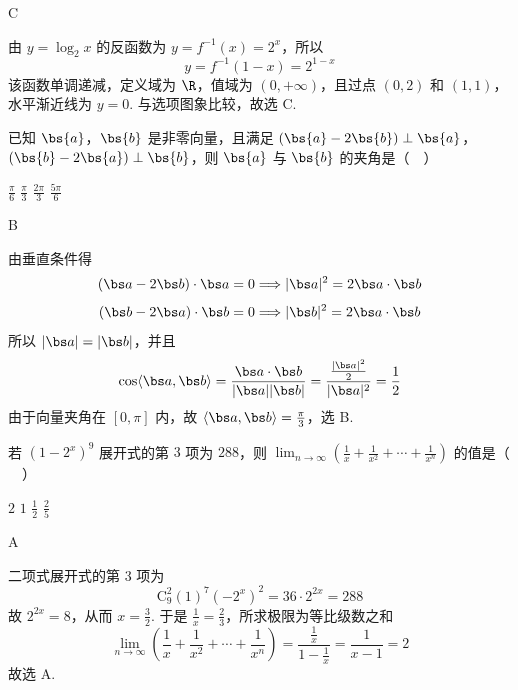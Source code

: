 \begin{answer}C\end{answer}

\begin{solution}
由 \(y=\log_2x\) 的反函数为 \(y=f^{-1}(x)=2^x\)，所以
\[
y=f^{-1}(1-x)=2^{1-x}
\]
该函数单调递减，定义域为 \(\R\)，值域为 \((0,+\infty)\)，且过点 \((0,2)\) 和 \((1,1)\)，水平渐近线为 \(y=0\).  与选项图象比较，故选 C.
\end{solution}

\begin{problem}
已知 \(\bs{a}\)，\(\bs{b}\) 是非零向量，且满足 \((\bs{a}-2\bs{b})\perp\bs{a}\)，\((\bs{b}-2\bs{a})\perp\bs{b}\)，则 \(\bs{a}\) 与 \(\bs{b}\) 的夹角是（\(\quad\)）

\choices
    {\(\frac{\pi}{6}\)}
    {\(\frac{\pi}{3}\)}
    {\(\frac{2\pi}{3}\)}
    {\(\frac{5\pi}{6}\)}
\end{problem}

\begin{answer}B\end{answer}

\begin{solution}
由垂直条件得
\[
(\bs a-2\bs b)\cdot\bs a=0\Longrightarrow |\bs a|^2=2\bs a\cdot\bs b
\]
\[
(\bs b-2\bs a)\cdot\bs b=0\Longrightarrow |\bs b|^2=2\bs a\cdot\bs b
\]
所以 \(|\bs a|=|\bs b|\)，并且
\[
\cos\langle\bs a,\bs b\rangle
 =\frac{\bs a\cdot\bs b}{|\bs a||\bs b|}
 =\frac{\frac{|\bs a|^2}{2}}{|\bs a|^2}=\frac12
\]
由于向量夹角在 \([0,\pi]\) 内，故 \(\langle\bs a,\bs b\rangle=\frac\pi3\)，选 B.
\end{solution}

\begin{problem}
若 \((1-2^x)^9\) 展开式的第 \(3\) 项为 \(288\)，则 \(\displaystyle\lim_{n\to\infty}\left(\frac{1}{x}+\frac{1}{x^2}+\cdots+\frac{1}{x^n}\right)\) 的值是（\(\quad\)）

\choices
    {\(2\)}
    {\(1\)}
    {\(\frac{1}{2}\)}
    {\(\frac{2}{5}\)}
\end{problem}

\begin{answer}A\end{answer}

\begin{solution}
二项式展开式的第 3 项为
\[
\mathrm C_9^2(1)^{7}(-2^x)^2=36\cdot2^{2x}=288
\]
故 \(2^{2x}=8\)，从而 \(x=\frac32\).  于是 \(\frac1x=\frac23\)，所求极限为等比级数之和
\[
\lim_{n\to\infty}\left(\frac1x+\frac1{x^2}+\cdots+\frac1{x^n}\right)
 =\frac{\frac{1}{x}}{1-\frac{1}{x}}=\frac{1}{x-1}=2
\]
故选 A.
\end{solution}

